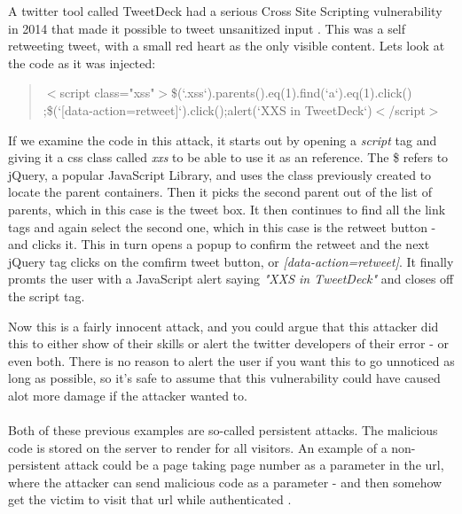 A twitter tool called TweetDeck had a serious Cross Site Scripting vulnerability in 2014 that made it possible to tweet unsanitized input \cite{TweetDeck}. This was a self retweeting tweet, with a small red heart as the only visible content. Lets look at the code as it was injected:
\begin{quote}
\selectfont
{$<$script class="xss"$>$\$(`.xss`).parents().eq(1).find(`a`).eq(1).click() \\ ;\$(`[data-action=retweet]`).click();alert(`XXS in TweetDeck`)$<$/script$>$}
\end{quote}
If we examine the code in this attack, it starts out by opening a \textit{script} tag and giving it a css class called \textit{xxs} to be able to use it as an reference. The \$ refers to jQuery, a popular JavaScript Library, and uses the class previously created to locate the parent containers. Then it picks the second parent out of the list of parents, which in this case is the tweet box. It then continues to find all the link tags and again select the second one, which in this case is the retweet button - and clicks it. This in turn opens a popup to confirm the retweet and the next jQuery tag clicks on the comfirm tweet button, or \textit{[data-action=retweet]}. It finally promts the user with a JavaScript alert saying \textit{"XXS in TweetDeck"} and closes off the script tag.

Now this is a fairly innocent attack, and you could argue that this attacker did this to either show of their skills or alert the twitter developers of their error - or even both. There is no reason to alert the user if you want this to go unnoticed as long as possible, so it's safe to assume that this vulnerability could have caused alot more damage if the attacker wanted to.
\\ \\
Both of these previous examples are so-called persistent attacks. The malicious code is stored on the server to render for all visitors. An example of a non-persistent attack could be a page taking page number as a parameter in the url, where the attacker can send malicious code as a parameter - and then somehow get the victim to visit that url while authenticated \cite{Edmunds2016}.

